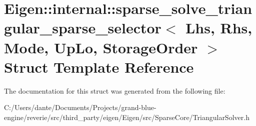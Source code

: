 \hypertarget{struct_eigen_1_1internal_1_1sparse__solve__triangular__sparse__selector}{}\section{Eigen\+::internal\+::sparse\+\_\+solve\+\_\+triangular\+\_\+sparse\+\_\+selector$<$ Lhs, Rhs, Mode, Up\+Lo, Storage\+Order $>$ Struct Template Reference}
\label{struct_eigen_1_1internal_1_1sparse__solve__triangular__sparse__selector}


The documentation for this struct was generated from the following file\+:\begin{DoxyCompactItemize}
\item 
C\+:/\+Users/dante/\+Documents/\+Projects/grand-\/blue-\/engine/reverie/src/third\+\_\+party/eigen/\+Eigen/src/\+Sparse\+Core/Triangular\+Solver.\+h\end{DoxyCompactItemize}
